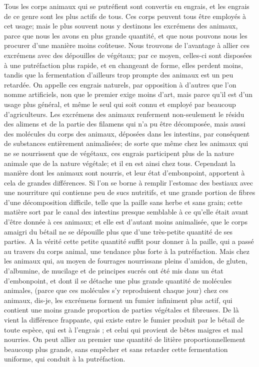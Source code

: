 Tous les corps animaux qui se putréfient sont convertis en engrais, et les engrais de ce genre sont les plus actifs de tous. Ces corps peuvent tous être employés à cet usage; mais le plus souvent nous y destinons les excrémens des animaux, parce que nous les avons en plus grande quantité, et que nous pouvons nous les procurer d'une manière moins coûteuse. Nous trouvons de l'avantage à allier ces excrémens avec des dépouilles de végétaux; par ce moyen, celles-ci sont disposées à une putréfaction plus rapide, et en changeant de forme, elles perdent moins, tandis que la fermentation d'ailleurs trop prompte des animaux est un peu retardée. On appelle ces engrais naturels, par opposition à d'autres que l'on nomme artificiels, non que le premier exige moins\setcounter{page}{231} d'art, mais parce qu'il est d'un usage plus général, et même le seul qui soit connu et employé par beaucoup d'agriculteurs.
Les excrémens des animaux renferment non-seulement le résidu des alimens et de la partie des filamens qui n'a pu être décomposée, mais aussi des molécules du corps des animaux, déposées dans les intestins, par conséquent de substances entièrement animalisées; de sorte que même chez les animaux qui ne se nourrissent que de végétaux, ces engrais participent plus de la nature animale que de la nature végétale; et il en est ainsi chez tous. Cependant la manière dont les animaux sont nourris, et leur état d'embonpoint, apportent à cela de grandes différences. Si l'on se borne à remplir l'estomac des bestiaux avec une nourriture qui contienne peu de sucs nutritifs, et une grande portion de fibres d'une décomposition difficile, telle que la paille sans herbe et sans grain; cette matière sort par le canal des intestins presque semblable à ce qu'elle était avant d'être donnée à ces animaux; et elle est d'autant moins animalisée, que le corps amaigri du bétail ne se dépouille plus que d'une très-petite quantité de ses parties. A la vérité cette petite quantité suffit pour donner à la paille, qui a passé au travers du corps animal, une tendance plus forte à la\setcounter{page}{232} putréfaction. Mais chez les animaux qui, au moyen de fourrages nourrissans pleins d'amidon, de gluten, d'albumine, de mucilage et de principes sucrés ont été mis dans un état d'embonpoint, et dont il se détache une plus grande quantité de molécules animales, (parce que ces molécules s'y reproduisent chaque jour) chez ces animaux, dis-je, les excrémens forment un fumier infiniment plus actif, qui contient une moins grande proportion de parties végétales et fibreuses. De là vient la différence frappante, qui existe entre le fumier produit par le bétail de toute espèce, qui est à l'engrais ; et celui qui provient de bêtes maigres et mal nourries. On peut allier au premier une quantité de litière proportionnellement beaucoup plus grande, sans empêcher et sans retarder cette fermentation uniforme, qui conduit à la putréfaction.
